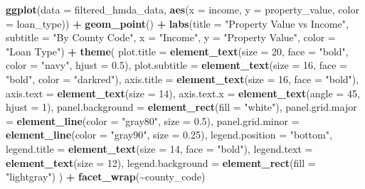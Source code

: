 \documentclass[
]{book}
\newenvironment{Shaded}{\begin{snugshade}}{\end{snugshade}}
\newcommand{\AttributeTok}[1]{\textcolor[rgb]{0.13,0.29,0.53}{#1}}
\newcommand{\DecValTok}[1]{\textcolor[rgb]{0.00,0.00,0.81}{#1}}
\newcommand{\FloatTok}[1]{\textcolor[rgb]{0.00,0.00,0.81}{#1}}
\newcommand{\FunctionTok}[1]{\textcolor[rgb]{0.13,0.29,0.53}{\textbf{#1}}}
\newcommand{\NormalTok}[1]{#1}
\newcommand{\SpecialCharTok}[1]{\textcolor[rgb]{0.81,0.36,0.00}{\textbf{#1}}}
\newcommand{\StringTok}[1]{\textcolor[rgb]{0.31,0.60,0.02}{#1}}
\begin{document}
\begin{Shaded}
\begin{Highlighting}[]
\FunctionTok{ggplot}\NormalTok{(}\AttributeTok{data =}\NormalTok{ filtered\_hmda\_data, }\FunctionTok{aes}\NormalTok{(}\AttributeTok{x =}\NormalTok{ income, }\AttributeTok{y =}\NormalTok{ property\_value, }\AttributeTok{color =}\NormalTok{ loan\_type)) }\SpecialCharTok{+}
  \FunctionTok{geom\_point}\NormalTok{() }\SpecialCharTok{+}
  \FunctionTok{labs}\NormalTok{(}\AttributeTok{title =} \StringTok{"Property Value vs Income"}\NormalTok{,}
       \AttributeTok{subtitle =} \StringTok{"By County Code"}\NormalTok{,}
       \AttributeTok{x =} \StringTok{"Income"}\NormalTok{,}
       \AttributeTok{y =} \StringTok{"Property Value"}\NormalTok{,}
       \AttributeTok{color =} \StringTok{"Loan Type"}\NormalTok{) }\SpecialCharTok{+}
  \FunctionTok{theme}\NormalTok{(}
    \AttributeTok{plot.title =} \FunctionTok{element\_text}\NormalTok{(}\AttributeTok{size =} \DecValTok{20}\NormalTok{, }\AttributeTok{face =} \StringTok{"bold"}\NormalTok{, }\AttributeTok{color =} \StringTok{"navy"}\NormalTok{, }\AttributeTok{hjust =} \FloatTok{0.5}\NormalTok{),}
    \AttributeTok{plot.subtitle =} \FunctionTok{element\_text}\NormalTok{(}\AttributeTok{size =} \DecValTok{16}\NormalTok{, }\AttributeTok{face =} \StringTok{"bold"}\NormalTok{, }\AttributeTok{color =} \StringTok{"darkred"}\NormalTok{),}
    \AttributeTok{axis.title =} \FunctionTok{element\_text}\NormalTok{(}\AttributeTok{size =} \DecValTok{16}\NormalTok{, }\AttributeTok{face =} \StringTok{"bold"}\NormalTok{),}
    \AttributeTok{axis.text =} \FunctionTok{element\_text}\NormalTok{(}\AttributeTok{size =} \DecValTok{14}\NormalTok{),}
    \AttributeTok{axis.text.x =} \FunctionTok{element\_text}\NormalTok{(}\AttributeTok{angle =} \DecValTok{45}\NormalTok{, }\AttributeTok{hjust =} \DecValTok{1}\NormalTok{),}
    \AttributeTok{panel.background =} \FunctionTok{element\_rect}\NormalTok{(}\AttributeTok{fill =} \StringTok{"white"}\NormalTok{),}
    \AttributeTok{panel.grid.major =} \FunctionTok{element\_line}\NormalTok{(}\AttributeTok{color =} \StringTok{"gray80"}\NormalTok{, }\AttributeTok{size =} \FloatTok{0.5}\NormalTok{),}
    \AttributeTok{panel.grid.minor =} \FunctionTok{element\_line}\NormalTok{(}\AttributeTok{color =} \StringTok{"gray90"}\NormalTok{, }\AttributeTok{size =} \FloatTok{0.25}\NormalTok{),}
    \AttributeTok{legend.position =} \StringTok{"bottom"}\NormalTok{,}
    \AttributeTok{legend.title =} \FunctionTok{element\_text}\NormalTok{(}\AttributeTok{size =} \DecValTok{14}\NormalTok{, }\AttributeTok{face =} \StringTok{"bold"}\NormalTok{),}
    \AttributeTok{legend.text =} \FunctionTok{element\_text}\NormalTok{(}\AttributeTok{size =} \DecValTok{12}\NormalTok{),}
    \AttributeTok{legend.background =} \FunctionTok{element\_rect}\NormalTok{(}\AttributeTok{fill =} \StringTok{"lightgray"}\NormalTok{)}
\NormalTok{  ) }\SpecialCharTok{+}
  \FunctionTok{facet\_wrap}\NormalTok{(}\SpecialCharTok{\textasciitilde{}}\NormalTok{county\_code)}
\end{Highlighting}
\end{Shaded}
\end{document}
